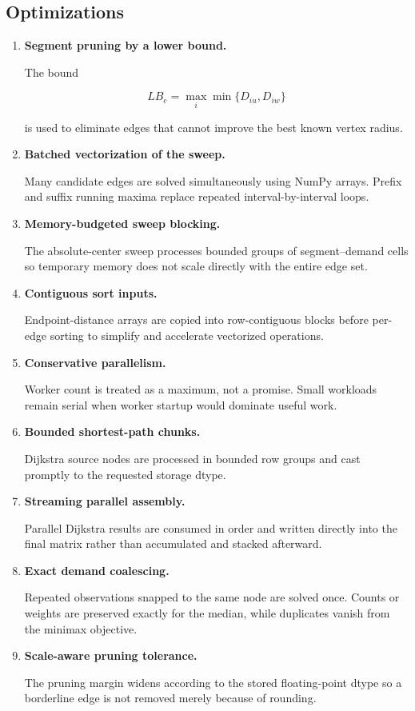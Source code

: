 \documentclass[11pt]{article}
\begin{document}
\subsection{Optimizations}

\begin{enumerate}[leftmargin=1.5em]

\item \textbf{Segment pruning by a lower bound.}

The bound

\[
LB_e
=
\max_i \min\{D_{iu},D_{iw}\}
\]

is used to eliminate edges that cannot improve the best known vertex radius.

\item \textbf{Batched vectorization of the sweep.}

Many candidate edges are solved simultaneously using NumPy arrays. Prefix and
suffix running maxima replace repeated interval-by-interval loops.

\item \textbf{Memory-budgeted sweep blocking.}

The absolute-center sweep processes bounded groups of segment--demand cells so
temporary memory does not scale directly with the entire edge set.

\item \textbf{Contiguous sort inputs.}

Endpoint-distance arrays are copied into row-contiguous blocks before
per-edge sorting to simplify and accelerate vectorized operations.

\item \textbf{Conservative parallelism.}

Worker count is treated as a maximum, not a promise. Small workloads remain
serial when worker startup would dominate useful work.

\item \textbf{Bounded shortest-path chunks.}

Dijkstra source nodes are processed in bounded row groups and cast promptly to
the requested storage dtype.

\item \textbf{Streaming parallel assembly.}

Parallel Dijkstra results are consumed in order and written directly into the
final matrix rather than accumulated and stacked afterward.

\item \textbf{Exact demand coalescing.}

Repeated observations snapped to the same node are solved once. Counts or
weights are preserved exactly for the median, while duplicates vanish from the
minimax objective.

\item \textbf{Scale-aware pruning tolerance.}

The pruning margin widens according to the stored floating-point dtype so a
borderline edge is not removed merely because of rounding.

\end{enumerate}
\end{document}
